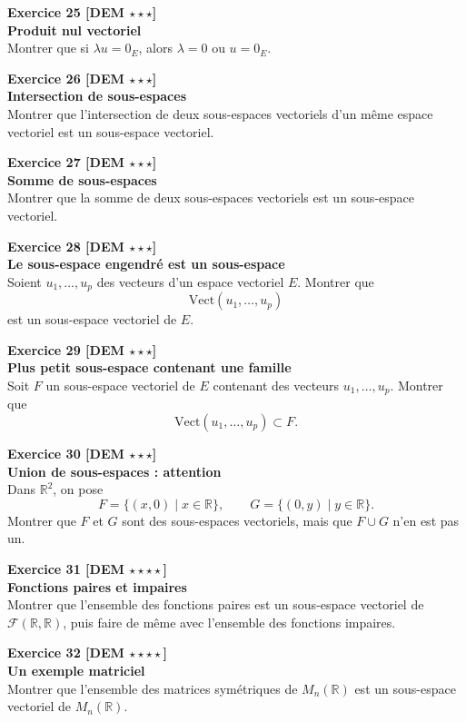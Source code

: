 \documentclass[11pt,a4paper]{article}
\begin{document}
\textbf{Exercice 25 [DEM $\star\star\star$]}\\
\textbf{Produit nul vectoriel}\\
Montrer que si $\lambda u=0_E$, alors $\lambda=0$ ou $u=0_E$.

\textbf{Exercice 26 [DEM $\star\star\star$]}\\
\textbf{Intersection de sous-espaces}\\
Montrer que l’intersection de deux sous-espaces vectoriels d’un même espace vectoriel est un sous-espace vectoriel.

\textbf{Exercice 27 [DEM $\star\star\star$]}\\
\textbf{Somme de sous-espaces}\\
Montrer que la somme de deux sous-espaces vectoriels est un sous-espace vectoriel.

\textbf{Exercice 28 [DEM $\star\star\star$]}\\
\textbf{Le sous-espace engendré est un sous-espace}\\
Soient $u_1,\dots,u_p$ des vecteurs d’un espace vectoriel $E$. Montrer que
\[
\mathrm{Vect}(u_1,\dots,u_p)
\]
est un sous-espace vectoriel de $E$.

\textbf{Exercice 29 [DEM $\star\star\star$]}\\
\textbf{Plus petit sous-espace contenant une famille}\\
Soit $F$ un sous-espace vectoriel de $E$ contenant des vecteurs $u_1,\dots,u_p$. Montrer que
\[
\mathrm{Vect}(u_1,\dots,u_p)\subset F.
\]

\textbf{Exercice 30 [DEM $\star\star\star$]}\\
\textbf{Union de sous-espaces : attention}\\
Dans $\mathbb{R}^2$, on pose
\[
F=\{(x,0)\mid x\in\mathbb{R}\},\qquad
G=\{(0,y)\mid y\in\mathbb{R}\}.
\]
Montrer que $F$ et $G$ sont des sous-espaces vectoriels, mais que $F\cup G$ n’en est pas un.

\textbf{Exercice 31 [DEM $\star\star\star\star$]}\\
\textbf{Fonctions paires et impaires}\\
Montrer que l’ensemble des fonctions paires est un sous-espace vectoriel de $\mathcal{F}(\mathbb{R},\mathbb{R})$, puis faire de même avec l’ensemble des fonctions impaires.

\textbf{Exercice 32 [DEM $\star\star\star\star$]}\\
\textbf{Un exemple matriciel}\\
Montrer que l’ensemble des matrices symétriques de $M_n(\mathbb{R})$ est un sous-espace vectoriel de $M_n(\mathbb{R})$.
\end{document}
